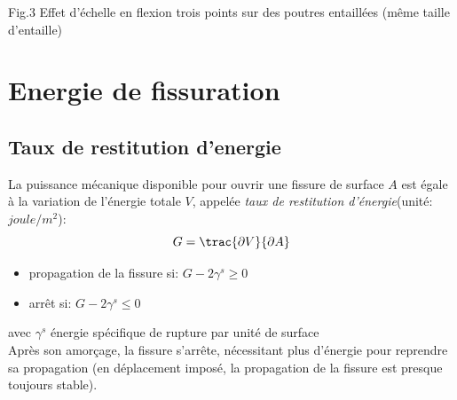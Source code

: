 \documentclass{DGC_M2_report}
\begin{document}
\begin{center}
\caption{Fig.3 Effet d'échelle en flexion trois points sur des poutres entaillées (même taille d'entaille)}
\end{center}



\chapter{Energie de fissuration}
\section{Taux de restitution d'energie}
\og La puissance mécanique disponible pour ouvrir une fissure de surface $A$ est égale à la variation de l'énergie totale $V$, appelée \emph{taux de restitution d'énergie}\fg{}(unité: $joule/m^2$):
\[G=\trac{\partial V}{\partial A}\]
\begin{itemize}
\item propagation de la fissure si: $G-2\gamma^s \geq 0$
\item arrêt si: {} {} {} {} {} {} {} {} {} {} {} {} {} {} {} {} {} {} {} {} {} {} {} {} {} {} {} {} {} {} {} $G-2\gamma^s \leq 0$
\end{itemize}
avec $\gamma^s$ énergie spécifique de rupture par unité de surface\\
Après son amorçage, la fissure s'arrête, nécessitant plus d'énergie pour reprendre sa propagation (en déplacement imposé, la propagation de la fissure est presque toujours stable).
\end{document}
